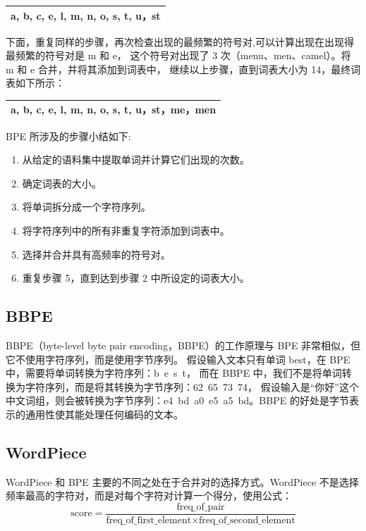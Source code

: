 \begin{table}[H]
	\centering
	\begin{tabular}{|l|}
		\hline
		a, b, c, e, l, m, n, o, s, t, u，st \\
		\hline
	\end{tabular}
\end{table}

下面，重复同样的步骤，再次检查出现的最频繁的符号对,可以计算出现在出现得最频繁的符号对是 m 和 e，
这个符号对出现了 3 次（menu、men、camel）。将 m 和 e 合并，并将其添加到词表中，
继续以上步骤，直到词表大小为 14，最终词表如下所示：

\begin{table}[H]
	\centering
	\begin{tabular}{|l|}
		\hline
		a, b, c, e, l, m, n, o, s, t, u，st，me，men \\
		\hline
	\end{tabular}
\end{table}

BPE 所涉及的步骤小结如下:

\begin{enumerate}
	\item 从给定的语料集中提取单词并计算它们出现的次数。
	\item 确定词表的大小。
	\item 将单词拆分成一个字符序列。
	\item 将字符序列中的所有非重复字符添加到词表中。
	\item 选择并合并具有高频率的符号对。
	\item 重复步骤 5，直到达到步骤 2 中所设定的词表大小。
\end{enumerate}

\subsection{BBPE}
BBPE（byte-level byte pair encoding，BBPE）的工作原理与 BPE 非常相似，但它不使用字符序列，而是使用字节序列。
假设输入文本只有单词 best，在 BPE 中，需要将单词转换为字符序列：b~e~s~t，
而在 BBPE 中，我们不是将单词转换为字符序列，而是将其转换为字节序列：62~65~73~74，
假设输入是“你好”这个中文词组，则会被转换为字节序列：e4~bd~a0~e5~a5~bd。BBPE 的好处是字节表示的通用性使其能处理任何编码的文本。

\subsection{WordPiece}
WordPiece 和 BPE 主要的不同之处在于合并对的选择方式。WordPiece 不是选择频率最高的字符对，而是对每个字符对计算一个得分，使用公式：
\[
	\text{score} = \frac{\text{freq\_of\_pair}}{\text{freq\_of\_first\_element} \times \text{freq\_of\_second\_element}}
\]
